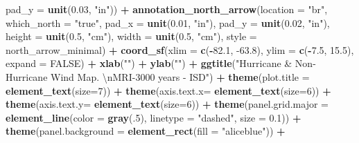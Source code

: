 \documentclass[12pt,oneside]{reedthesis}
\newenvironment{Shaded}{\begin{snugshade}}{\end{snugshade}}
\newcommand{\CharTok}[1]{\textcolor[rgb]{0.31,0.60,0.02}{#1}}
\newcommand{\DataTypeTok}[1]{\textcolor[rgb]{0.13,0.29,0.53}{#1}}
\newcommand{\DecValTok}[1]{\textcolor[rgb]{0.00,0.00,0.81}{#1}}
\newcommand{\FloatTok}[1]{\textcolor[rgb]{0.00,0.00,0.81}{#1}}
\newcommand{\KeywordTok}[1]{\textcolor[rgb]{0.13,0.29,0.53}{\textbf{#1}}}
\newcommand{\NormalTok}[1]{#1}
\newcommand{\OperatorTok}[1]{\textcolor[rgb]{0.81,0.36,0.00}{\textbf{#1}}}
\newcommand{\OtherTok}[1]{\textcolor[rgb]{0.56,0.35,0.01}{#1}}
\newcommand{\StringTok}[1]{\textcolor[rgb]{0.31,0.60,0.02}{#1}}
\begin{document}
\begin{Shaded}
\begin{Highlighting}[]
   \DataTypeTok{pad_y =} \KeywordTok{unit}\NormalTok{(}\FloatTok{0.03}\NormalTok{, }\StringTok{"in"}\NormalTok{)) }\OperatorTok{+}\StringTok{ }
\StringTok{  }\KeywordTok{annotation_north_arrow}\NormalTok{(}\DataTypeTok{location =} \StringTok{"br"}\NormalTok{, }\DataTypeTok{which_north =} \StringTok{"true"}\NormalTok{, }\DataTypeTok{pad_x =} \KeywordTok{unit}\NormalTok{(}\FloatTok{0.01}\NormalTok{, }\StringTok{"in"}\NormalTok{), }\DataTypeTok{pad_y =} \KeywordTok{unit}\NormalTok{(}\FloatTok{0.02}\NormalTok{, }\StringTok{"in"}\NormalTok{), }\DataTypeTok{height =} \KeywordTok{unit}\NormalTok{(}\FloatTok{0.5}\NormalTok{, }\StringTok{"cm"}\NormalTok{), }
   \DataTypeTok{width =} \KeywordTok{unit}\NormalTok{(}\FloatTok{0.5}\NormalTok{, }\StringTok{"cm"}\NormalTok{), }\DataTypeTok{style =}\NormalTok{ north_arrow_minimal) }\OperatorTok{+}
\StringTok{  }\KeywordTok{coord_sf}\NormalTok{(}\DataTypeTok{xlim =} \KeywordTok{c}\NormalTok{(}\OperatorTok{-}\FloatTok{82.1}\NormalTok{, }\FloatTok{-63.8}\NormalTok{), }\DataTypeTok{ylim =} \KeywordTok{c}\NormalTok{(}\OperatorTok{-}\FloatTok{7.5}\NormalTok{, }\FloatTok{15.5}\NormalTok{), }\DataTypeTok{expand =} \OtherTok{FALSE}\NormalTok{) }\OperatorTok{+}
\StringTok{  }\KeywordTok{xlab}\NormalTok{(}\StringTok{""}\NormalTok{) }\OperatorTok{+}\StringTok{ }
\StringTok{  }\KeywordTok{ylab}\NormalTok{(}\StringTok{""}\NormalTok{) }\OperatorTok{+}\StringTok{ }
\StringTok{  }\KeywordTok{ggtitle}\NormalTok{(}\StringTok{"Hurricane & Non-Hurricane Wind Map. }\CharTok{\textbackslash{}n}\StringTok{MRI-3000 years - ISD"}\NormalTok{) }\OperatorTok{+}\StringTok{ }
\StringTok{  }\KeywordTok{theme}\NormalTok{(}\DataTypeTok{plot.title =} \KeywordTok{element_text}\NormalTok{(}\DataTypeTok{size=}\DecValTok{7}\NormalTok{)) }\OperatorTok{+}
\StringTok{  }\KeywordTok{theme}\NormalTok{(}\DataTypeTok{axis.text.x=} \KeywordTok{element_text}\NormalTok{(}\DataTypeTok{size=}\DecValTok{6}\NormalTok{)) }\OperatorTok{+}\StringTok{ }
\StringTok{  }\KeywordTok{theme}\NormalTok{(}\DataTypeTok{axis.text.y=} \KeywordTok{element_text}\NormalTok{(}\DataTypeTok{size=}\DecValTok{6}\NormalTok{)) }\OperatorTok{+}
\StringTok{  }\KeywordTok{theme}\NormalTok{(}\DataTypeTok{panel.grid.major =} \KeywordTok{element_line}\NormalTok{(}\DataTypeTok{color =} \KeywordTok{gray}\NormalTok{(.}\DecValTok{5}\NormalTok{), }\DataTypeTok{linetype =} \StringTok{"dashed"}\NormalTok{, }\DataTypeTok{size =} \FloatTok{0.1}\NormalTok{)) }\OperatorTok{+}
\StringTok{  }\KeywordTok{theme}\NormalTok{(}\DataTypeTok{panel.background =} \KeywordTok{element_rect}\NormalTok{(}\DataTypeTok{fill =} \StringTok{"aliceblue"}\NormalTok{)) }\OperatorTok{+}

\end{Highlighting}
\end{Shaded}
\end{document}
